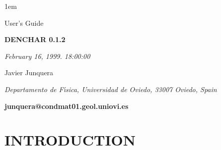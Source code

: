 %
%



\textheight 22cm
\textwidth 16cm
\oddsidemargin 1mm
\topmargin -15mm

\baselineskip=14pt
\parskip 5pt
\parindent 1em




\begin{titlepage}

\begin{center}

\vspace{1cm}

{\huge {\sc User's Guide}}

\vspace{4cm}

{\Huge {\bf DENCHAR 0.1.2} }

\vspace{3cm}

{\Large {\it February 16, 1999. 18:00:00} }

\vspace{3cm}

{\Large Javier Junquera}

\vspace{5pt}

{\it Departamento de F\'{\i}sica, Universidad de
Oviedo, 33007 Oviedo, Spain}

\vspace{7mm}

\vspace{3cm}
{\bf junquera@condmat01.geol.uniovi.es}

\end{center}

\end{titlepage}


\tableofcontents

\newpage



\section{INTRODUCTION}

